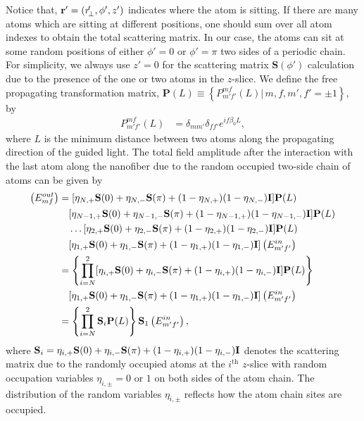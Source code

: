 \documentclass[preprint,aps,pra,onecolumn]{revtex4-1} %
\begin{document}
Notice that, $\mathbf{r}'=(r\!_\perp^\prime,\phi',z')$ indicates where the atom is sitting. If there are many atoms which are sitting at different positions, one should sum over all atom indexes to obtain the total scattering matrix. In our case, the atoms can sit at some random positions of either $\phi'=0$ or $\phi'=\pi$ two sides of a periodic chain. For simplicity, we always use $z'=0$ for the scattering matrix $\mathbf{S}(\phi')$ calculation due to the presence of the one or two atoms in the $z$-slice. We define the free propagating transformation matrix, $\mathbf{P}(L)\equiv \left\{P^{mf}_{m'f'}(L)|\,m,f,m',f'=\pm 1 \right\}$, by
\begin{align}
P^{mf}_{m'f'}(L) &= \delta_{mm'}\delta_{ff'}e^{if\beta_0 L},
\end{align}
where $L$ is the minimum distance between two atoms along the propagating direction of the guided light. The total field amplitude after the interaction with the last atom along the nanofiber due to the random occupied two-side chain of atoms can be given by
\begin{align}
\left( E_{mf}^{out}\right) &= [\eta_{N,+} \mathbf{S}(0) +\eta_{N,-}\mathbf{S}(\pi) +(1-\eta_{N,+})(1-\eta_{N,-})\mathbf{I}] \mathbf{P}(L)\nonumber\\
&\quad [\eta_{N-1,+} \mathbf{S}(0) +\eta_{N-1,-}\mathbf{S}(\pi)+(1-\eta_{N-1,+})(1-\eta_{N-1,-})\mathbf{I} ] \mathbf{P}(L)\nonumber\\
&\quad \ldots [\eta_{2,+} \mathbf{S}(0) +\eta_{2,-}\mathbf{S}(\pi)+(1-\eta_{2,+})(1-\eta_{2,-})\mathbf{I} ] \mathbf{P}(L)\nonumber\\
&\quad [\eta_{1,+} \mathbf{S}(0) +\eta_{1,-}\mathbf{S}(\pi) +(1-\eta_{1,+})(1-\eta_{1,-})\mathbf{I}] \left( E_{m'f'}^{in}\right)\\
&= \left\{ \prod_{i=N}^2 [\eta_{i,+} \mathbf{S}(0) +\eta_{i,-}\mathbf{S}(\pi)+(1-\eta_{i,+})(1-\eta_{i,-})\mathbf{I} ] \mathbf{P}(L)\right\} \nonumber\\
&\quad [\eta_{1,+} \mathbf{S}(0) +\eta_{1,-}\mathbf{S}(\pi)+(1-\eta_{1,+})(1-\eta_{1,-})\mathbf{I} ]\left( E_{m'f'}^{in}\right)\\
&= \left\{ \prod_{i=N}^2 \mathbf{S}_i \mathbf{P}(L)\right\} \mathbf{S}_1 \left( E_{m'f'}^{in}\right),\label{eq:transE}
\end{align}
where $\mathbf{S}_i=\eta_{i,+} \mathbf{S}(0) +\eta_{i,-}\mathbf{S}(\pi)+(1-\eta_{i,+})(1-\eta_{i,-})\mathbf{I} $ denotes the scattering matrix due to the randomly occupied atoms at the $i^{\mathrm{th}}$ $z$-slice with random occupation variables $\eta_{i,\pm}=0$ or $1$ on both sides of the atom chain. The distribution of the random variables $\eta_{i,\pm}$ reflects how the atom chain sites are occupied. 
\end{document}
